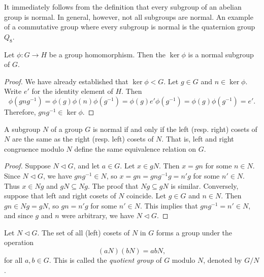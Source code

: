 \begin{example}
    It immediately follows from the definition that every subgroup of an abelian group is normal. In general, however, not all subgroups are normal. An example of a commutative group where every subgroup is normal is the quaternion group \(Q_8\).
\end{example}

\begin{theorem}
    Let \(\phi : G \to H\) be a group homomorphism. Then the \(\ker \phi\) is a normal subgroup of \(G\).
\end{theorem}

\begin{proof}
    We have already established that \(\ker \phi < G\). Let \(g \in G\) and \(n \in \ker \phi\). Write \(e'\) for the identity element of \(H\). Then
    \[
        \phi(gng^{-1}) = \phi(g)\phi(n)\phi(g^{-1}) = \phi(g)e'\phi(g^{-1}) = \phi(g)\phi(g^{-1}) = e'.
    \]
    Therefore, \(gng^{-1} \in \ker \phi\).
\end{proof}

\begin{theorem}
    A subgroup \(N\) of a group \(G\) is normal if and only if the left (resp. right) cosets of \(N\) are the same as the right (resp. left) cosets of \(N\). That is, left and right congruence modulo \(N\) define the same equivalence relation on \(G\).
\end{theorem}

\begin{proof}
    Suppose \(N \triangleleft G\), and let \(a \in G\). Let \(x \in gN\). Then \(x = gn\) for some \(n \in N\). Since \(N \triangleleft G\), we have \(gng^{-1} \in N\), so \(x = gn = gng^{-1}g = n'g\) for some \(n' \in N\). Thus \(x \in Ng\) and \(gN \subseteq Ng\). The proof that \(Ng \subseteq gN\) is similar. Conversely, suppose that left and right cosets of \(N\) coincide. Let \(g \in G\) and \(n \in N\). Then \(gn \in Ng = gN\), so \(gn = n'g\) for some \(n' \in N\). This implies that \(gng^{-1} = n' \in N\), and since \(g\) and \(n\) were arbitrary, we have \(N \triangleleft G\).
\end{proof}

\begin{theorem}
    \label{thm:quotient-group}
    Let \(N \triangleleft G\). The set of all (left) cosets of \(N\) in \(G\) forms a group under the operation
    \[
        (aN)(bN) = abN,
    \]
    for all \(a, b \in G\). This is called the \emph{quotient group} of \(G\) modulo \(N\), denoted by \(G/N\).
\end{theorem}


